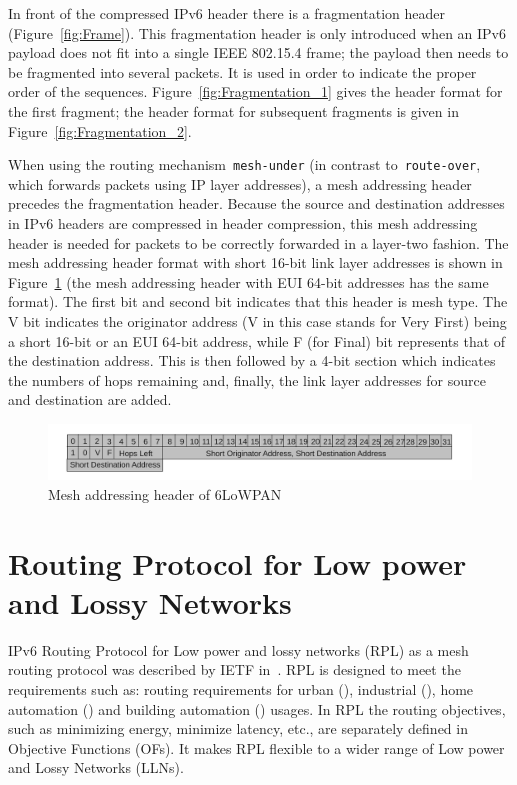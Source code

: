 In front of the compressed IPv6 header there is a fragmentation header (Figure~\ref{fig:Frame})\@. This fragmentation header is only introduced when an IPv6 payload does not fit into a single IEEE 802.15.4 frame;
the payload then needs to be fragmented into several packets. It is used in order to indicate the proper order of the sequences. Figure~\ref{fig:Fragmentation_1} gives the header format for the first
fragment; the header format for subsequent fragments is given in Figure~\ref{fig:Fragmentation_2}.

When using the routing mechanism~\texttt{mesh-under} (in contrast to~\texttt{route-over}, which forwards packets using IP layer addresses)\@, a mesh addressing header precedes the fragmentation header. Because the source and destination addresses in IPv6 headers are compressed in header compression, this mesh addressing header is needed for packets to be correctly forwarded in a layer-two fashion. The mesh addressing header format with short 16-bit link layer addresses is shown in Figure~\ref{fig:Mesh} (the mesh addressing header with EUI 64-bit addresses has the same format)\@. The first bit and second bit indicates that this header is mesh type. The V bit indicates the originator address (V in this case stands for Very First) being a short 16-bit or an EUI 64-bit address, while F (for Final) bit represents that of the destination address.  This is then followed by a 4-bit section which indicates the numbers of hops remaining and, finally, the link layer addresses for source and destination are added.
\begin{figure}[htbp]
  \begin{center}
    \leavevmode
      \includegraphics[scale=0.8]{Pics/Mesh.pdf}%
    \caption{Mesh addressing header of 6LoWPAN}
    \label{fig:Mesh}
  \end{center}
\end{figure}

\section{Routing Protocol for Low power and Lossy Networks}
\label{RPL}
IPv6 Routing Protocol for Low power and lossy networks (RPL) as a mesh routing protocol was described by IETF in~\cite{draft-ietf-roll-rpl-19}. RPL is designed to meet the requirements such as: routing requirements for urban (\cite{RFC 5548})\@, industrial (\cite{RFC 5673})\@, home automation (\cite{RFC 5826}) and building automation (\cite{RFC 5867}) usages\@. In RPL the routing objectives, such as minimizing energy, minimize latency, etc., are separately defined in Objective Functions (OFs)\@. It makes RPL flexible to a wider range of Low power and Lossy Networks (LLNs)\@.

